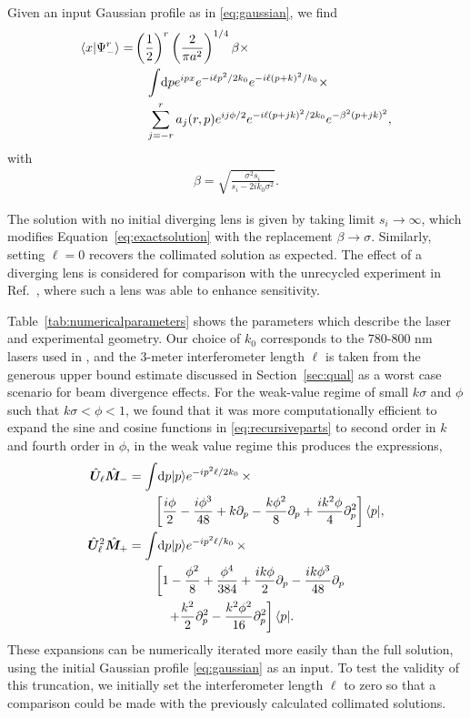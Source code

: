 Given an input Gaussian profile as in \eqref{eq:gaussian}, we find 
\begin{align}\label{eq:exactsolution}
\langle x \vert \Psi_-^r \rangle =& \left(\frac{1}{2}\right)^{r}\left(\frac{2}{\pi a^2}\right)^{1/4} \beta \times \\
&\quad \int \!\mathrm{d}p e^{ipx} e^{-i\ell p^2/2k_0}e^{-i\ell (p+k)^2/k_0}  \times \nonumber \\
&\quad \sum_{j=-r}^{r}a_j(r,p)e^{ij\phi/2}e^{-i\ell(p+jk)^2/2k_0}e^{-\beta^2(p+jk)^2}, \nonumber 
\end{align}
with 
\begin{align}
\beta = \sqrt{\frac{\sigma^2 s_i}{s_i - 2ik_0\sigma^2}}.
\end{align} 

The solution with no initial diverging lens is given by taking limit $s_i \rightarrow \infty$, which modifies Equation~\eqref{eq:exactsolution} with the replacement $\beta \rightarrow \sigma$.  Similarly, setting $\ell = 0$ recovers the collimated solution as expected.  The effect of a diverging lens is considered for comparison with the unrecycled experiment in Ref.~\cite{Dixon2009}, where such a lens was able to enhance sensitivity.  

Table~\ref{tab:numericalparameters} shows the parameters which describe the laser and experimental geometry. Our choice of $k_0$ corresponds to the 780-800 nm lasers used in \cite{Dixon2009,Starling2009,Starling2010a,Starling2010b}, and the 3-meter interferometer length $\ell$ is taken from the generous upper bound estimate discussed in Section~\ref{sec:qual} as a worst case scenario for beam divergence effects.  For the weak-value regime of small $k\sigma$ and $\phi$ such that $k\sigma < \phi < 1$, we found that it was more computationally efficient to expand the sine and cosine functions in \eqref{eq:recursiveparts} to second order in $k$ and fourth order in $\phi$, in the weak value regime this produces the expressions, 
\begin{subequations}\label{eq:approximateexpansions}
\begin{align}
 \hat{\bm U}_\ell\hat{\bm M}_- &= \int \! \mathrm{d}p\lvert p\rangle e^{-ip^2\ell/2k_0}\, \times \\
 &\qquad \left[\frac{i\phi}{2} -\frac{i\phi^3}{48} + k\partial_p - \frac{k\phi^2}{8}\partial_p + \frac{ik^2\phi}{4} \partial_p^2\right]\langle p \rvert, \nonumber \\
 \hat{\bm U}_\ell^2 \hat{\bm M}_+ &= \int \! \mathrm{d}p\lvert p\rangle e^{-ip^2\ell/k_0}\, \times \\
 &\qquad \left[1 - \frac{\phi^2}{8} + \frac{\phi^4}{384} + \frac{ik\phi}{2}\partial_p - \frac{ik\phi^3}{48}\partial_p \right.\nonumber \\
 &\qquad\quad\left. + \frac{k^2}{2}\partial_p^2 - \frac{k^2\phi^2}{16}\partial_p^2\right]\langle p \rvert . \nonumber
\end{align}
\end{subequations}
These expansions can be numerically iterated more easily than the full solution, using the initial Gaussian profile \eqref{eq:gaussian} as an input.  To test the validity of this truncation, we initially set the interferometer length $\ell$ to zero so that a comparison could be made with the previously calculated collimated solutions.

